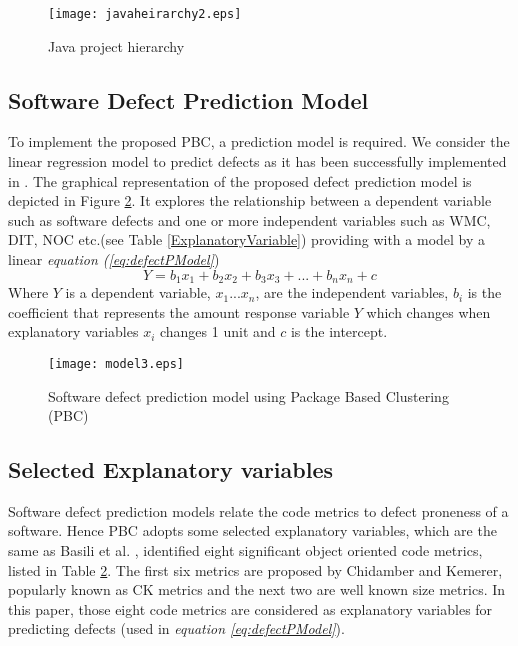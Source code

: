 \documentclass[12pt]{report}
\begin{document}
\begin{figure}[h!]
\centering
      \texttt{[image: javaheirarchy2.eps]}
			\caption{Java project hierarchy}
			\label{JavaStructure}
\end{figure}


\subsection{Software Defect Prediction Model}
To implement the proposed PBC, a prediction model is required. We consider the linear regression model \cite{draper1981applied} to predict defects as it has been successfully implemented in \cite{tan2011assessing,basili1996validation}. The graphical representation of the proposed defect prediction model is depicted in {Figure \ref{defectPModel}. It explores the relationship between a dependent variable such as software defects and one or more independent variables such as WMC, DIT, NOC etc.(see Table \ref{ExplanatoryVariable}) providing with a model by a linear \textit{equation (\ref{eq:defectPModel}}) 
\begin{equation}
\label{eq:defectPModel}
 Y=b_{1}x_{1}+b_{2}x_{2}+b_{3}x_{3}+...+b_{n}x_{n}+c
\end{equation}}
Where $Y$ is a dependent variable, $x_{1}...x_{n}$, are the independent variables, $b_{i}$ is the coefficient that represents the amount response variable $Y$ which changes when explanatory variables $x_{i}$ changes 1 unit and $c$ is the intercept.

\begin{figure}[h!]
\center
      \texttt{[image: model3.eps]}
		\caption{Software defect prediction model using Package Based Clustering (PBC)}
		\label{defectPModel}	
\end{figure}



\subsection{Selected Explanatory variables}

Software defect prediction models relate the code metrics to defect proneness of a software. Hence PBC adopts some selected explanatory variables, which are the same as Basili et al. \cite{basili1996validation,di2011genetic}, identified eight significant object oriented code metrics, listed in Table \ref{defectPModel}. The first six metrics are proposed by Chidamber and Kemerer, popularly known as CK metrics \cite{chidamber1994metrics} and the next two are well known size metrics. In this paper, those eight code metrics are considered as explanatory variables for predicting defects (used in \textit{equation \ref{eq:defectPModel}}).
\end{document}
